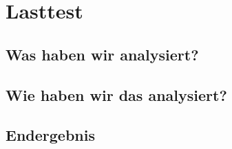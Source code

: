 \section{Lasttest}\label{Lasttest}


\subsection{Was haben wir analysiert?}



\subsection{Wie haben wir das analysiert?}



\subsection{Endergebnis}
